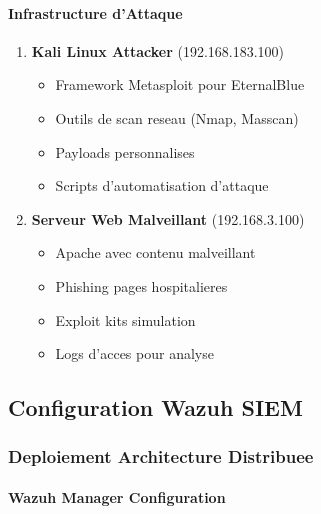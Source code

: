 \paragraph{Infrastructure d'Attaque}
\begin{enumerate}
    \item \textbf{Kali Linux Attacker} (192.168.183.100)
          \begin{itemize}
              \item Framework Metasploit pour EternalBlue
              \item Outils de scan reseau (Nmap, Masscan)
              \item Payloads personnalises
              \item Scripts d'automatisation d'attaque
          \end{itemize}

    \item \textbf{Serveur Web Malveillant} (192.168.3.100)
          \begin{itemize}
              \item Apache avec contenu malveillant
              \item Phishing pages hospitalieres
              \item Exploit kits simulation
              \item Logs d'acces pour analyse
          \end{itemize}
\end{enumerate}

\subsection{Configuration Wazuh SIEM}

\subsubsection{Deploiement Architecture Distribuee}

\paragraph{Wazuh Manager Configuration}

